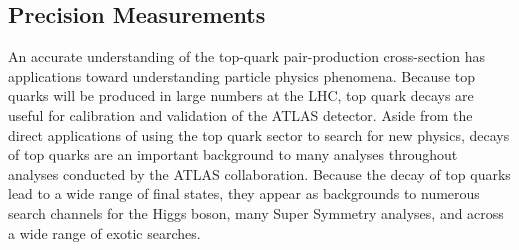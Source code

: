 \subsection{Precision Measurements}
An accurate understanding of the top-quark pair-production cross-section has applications toward understanding particle physics phenomena.
Because top quarks will be produced in large numbers at the LHC, top quark decays are useful for
calibration and validation of the ATLAS detector.
Aside from the direct applications of using the top quark sector to search for new physics,
decays of top quarks are an important background to many analyses throughout analyses conducted by the ATLAS collaboration.
Because the decay of top quarks lead to a wide range of final states, they appear as backgrounds to
numerous search channels for the Higgs boson, many Super Symmetry analyses, and across a wide range of exotic searches.







